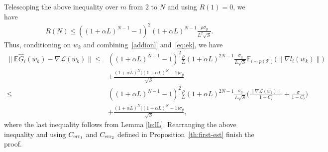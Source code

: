\documentclass{osudissert96}
\begin{document}
	Telescoping the above inequality over $m$ from $2$ to $N$ and using $R(1) =0$, we have 
	\begin{align}\label{addionl}
	R(N) \leq ((1+\alpha L)^{N-1}-1)^2 (1+\alpha L)^{N-1}\frac{\rho \sigma_g}{L^2\sqrt{S}}.
	\end{align}
	Thus, conditioning on $w_k$ and combining~\cref{addionl} and~\cref{eq:ek}, we have 
{\small	\begin{align*}
	\|\mathbb{E} \widehat G_i(w_k)  - \nabla \mathcal{L}(w_k)\|  
	 \leq & ((1+\alpha L)^{N-1}-1)^2\frac{\rho}{L} (1+\alpha L)^{2N-1}\frac{\sigma_g}{L\sqrt{S}}  \mathbb{E}_{ i\sim p(\mathcal{T})} \big(\big\| \nabla l_i( w_{k}) \big \|   \big) \nonumber
	\\ &+   \frac{(1+\alpha L)^N ((1+\alpha L)^N -1\big)\sigma_g}{\sqrt{S}}\nonumber
	\\\leq &((1+\alpha L)^{N-1}-1)^2\frac{\rho}{L} (1+\alpha L)^{2N-1}\frac{\sigma_g}{L\sqrt{S}}  \Big( \frac{\|\nabla \mathcal{L}(w_k)\| }{1-C_l} + \frac{\sigma }{1-C_l}     \Big) \nonumber
	\\ &+   \frac{(1+\alpha L)^N ((1+\alpha L)^N -1\big)\sigma_g}{\sqrt{S}}, 
	\end{align*} }
\hspace{-0.24cm}	where the last inequality follows from Lemma \ref{le:lL}. 
	Rearranging the above inequality and using $C_{\text{\normalfont err}_1} $ and $C_{\text{\normalfont err}_2}$ defined in Proposition~\ref{th:first-est} finish the proof.  

\end{document}

